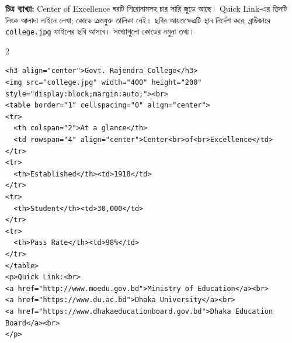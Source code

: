 \noindent\begin{minipage}{\linewidth}
\end{minipage}\par
\par\smallskip
\par\smallskip\textbf{চিত্র ব্যাখ্যা:} 
Center of Excellence ঘরটি শিরোনামসহ চার সারি জুড়ে আছে। Quick Link-এর তিনটি লিংক আলাদা লাইনে লেখা; কোডে ক্রমযুক্ত তালিকা নেই। ছবির আয়তক্ষেত্রটি স্থান নির্দেশ করে; ব্রাউজারে \texttt{college.jpg} ফাইলের ছবি আসবে। সংখ্যাগুলো কোডের নমুনা তথ্য।






\par\smallskip
{}
\par{}\par\smallskip
\begin{multicols}{2}
\begin{verbatim}
<h3 align="center">Govt. Rajendra College</h3>
<img src="college.jpg" width="400" height="200" style="display:block;margin:auto;"><br>
<table border="1" cellspacing="0" align="center">
<tr>
  <th colspan="2">At a glance</th>
  <td rowspan="4" align="center">Center<br>of<br>Excellence</td>
</tr>
<tr>
  <th>Established</th><td>1918</td>
</tr>
<tr>
  <th>Student</th><td>30,000</td>
</tr>
<tr>
  <th>Pass Rate</th><td>98%</td>
</tr>
</table>
<p>Quick Link:<br>
<a href="http://www.moedu.gov.bd">Ministry of Education</a><br>
<a href="https://www.du.ac.bd">Dhaka University</a><br>
<a href="https://www.dhakaeducationboard.gov.bd">Dhaka Education Board</a><br>
</p>
\end{verbatim}
\end{multicols}
\smallskip


